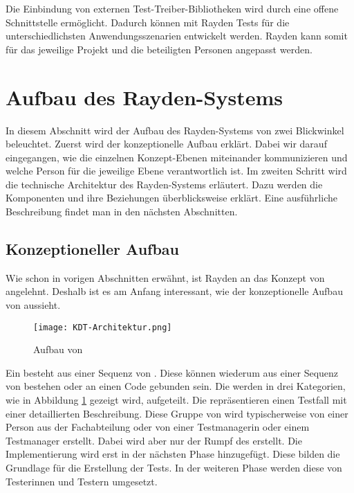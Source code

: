 \SuperPar
Die Einbindung von externen Test-Treiber-Bibliotheken wird durch eine offene Schnittstelle ermöglicht. Dadurch können mit Rayden Tests für die unterschiedlichsten Anwendungsszenarien entwickelt werden. Rayden kann somit für das jeweilige Projekt und die beteiligten Personen angepasst werden. 


\section{Aufbau des Rayden-Systems}

In diesem Abschnitt wird der Aufbau des Rayden-Systems von zwei Blickwinkel beleuchtet. Zuerst wird der konzeptionelle Aufbau erklärt. Dabei wir darauf eingegangen, wie die einzelnen Konzept-Ebenen miteinander kommunizieren und welche Person für die jeweilige Ebene verantwortlich ist. Im zweiten Schritt wird die technische Architektur des Rayden-Systems erläutert. Dazu werden die Komponenten und ihre Beziehungen überblicksweise erklärt. Eine ausführliche Beschreibung findet man in den nächsten Abschnitten.

\subsection{Konzeptioneller Aufbau}

Wie schon in vorigen Abschnitten erwähnt, ist Rayden an das Konzept von  angelehnt. Deshalb ist es am Anfang interessant, wie der konzeptionelle Aufbau von  aussieht. 

\begin{figure}[h]
\centering
\texttt{[image: KDT-Architektur.png]}
\caption{Aufbau von }
\label{fig:kdt-arch}
\end{figure}

\SuperPar
Ein  besteht aus einer Sequenz von . Diese  können wiederum aus einer Sequenz von  bestehen oder an einen Code gebunden sein. Die  werden in drei Kategorien, wie in Abbildung \ref{fig:kdt-arch} gezeigt wird, aufgeteilt. Die  repräsentieren einen Testfall mit einer detaillierten Beschreibung. Diese Gruppe von  wird typischerweise von einer Person aus der Fachabteilung oder von einer Testmanagerin oder einem Testmanager erstellt. Dabei wird aber nur der Rumpf des  erstellt. Die Implementierung wird erst in der nächsten Phase hinzugefügt. Diese  bilden die Grundlage für die Erstellung der Tests. In der weiteren Phase werden diese  von Testerinnen und Testern umgesetzt.

